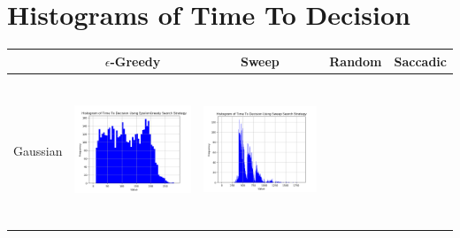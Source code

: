 
\chapter{Histograms of Time To Decision}



\begin{landscape}
\centering
\vspace*{\fill}
\begin{table}[h!]
  \centering
  \begin{tabular}{ | c | c | c | c | c |}
    \hline
    & $\epsilon$-Greedy & Sweep & Random & Saccadic \\
    \hline
    Gaussian & \vline
    \begin{minipage}[c][45mm][c]{45mm}
      \includegraphics[width=44mm, height=44mm]{Chapters/MultiAgentTargetDetection/Figs/Results/Prior/Gaussian/SingleAgentSingleSourceGaussianEpsilonGreedyHistogram.png}
    \end{minipage}
    &
    \begin{minipage}[c][45mm][c]{45mm}
      \includegraphics[width=44mm, height=44mm]{Chapters/MultiAgentTargetDetection/Figs/Results/Prior/Gaussian/SingleAgentSingleSourceGaussianSweepHistogram.png}


\end{minipage}
\end{tabular}
\end{table}
\end{landscape}
